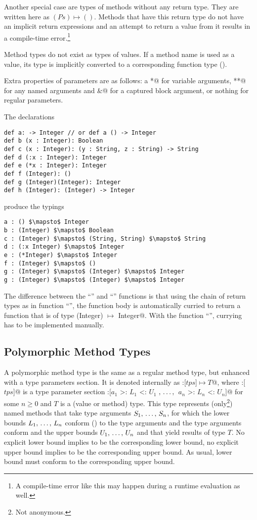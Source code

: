 Another special case are types of methods without any return type. They are written here as $(Ps) \mapsto ()$. Methods that have this return type do not have an implicit return expressions and an attempt to return a value from it results in a compile-time error.\footnote{A compile-time error like this may happen during a runtime evaluation as well.}

Method types do not exist as types of values. If a method name is used as a value, its type is implicitly converted to a corresponding function type (). 

Extra properties of parameters are as follows: a \lstinline@*@ for variable arguments, \lstinline@**@ for any named arguments and \lstinline@&@ for a captured block argument, or nothing for regular parameters. 

\example The declarations
\begin{lstlisting}
def a: -> Integer // or def a () -> Integer
def b (x : Integer): Boolean
def c (x : Integer): (y : String, z : String) -> String
def d (:x : Integer): Integer
def e (*x : Integer): Integer
def f (Integer): ()
def g (Integer)(Integer): Integer
def h (Integer): (Integer) -> Integer
\end{lstlisting}
produce the typings
\begin{lstlisting}
a : () $\mapsto$ Integer
b : (Integer) $\mapsto$ Boolean
c : (Integer) $\mapsto$ (String, String) $\mapsto$ String
d : (:x Integer) $\mapsto$ Integer
e : (*Integer) $\mapsto$ Integer
f : (Integer) $\mapsto$ ()
g : (Integer) $\mapsto$ (Integer) $\mapsto$ Integer
g : (Integer) $\mapsto$ (Integer) $\mapsto$ Integer
\end{lstlisting}

The difference between the ``'' and ``'' functions is that using the chain of return types as in function ``'', the function body is automatically curried to return a function that is of type \lstinline@(Integer) $\mapsto$ Integer@. With the function ``'', currying has to be implemented manually. 

\subsection{Polymorphic Method Types}
\label{sec:polymorphic-method-types}

A polymorphic method type is the same as a regular method type, but enhanced with a type parameters section. It is denoted internally as \lstinline@:[$tps$]$ \mapsto T$@, where \lstinline@:[$tps$]@ is a type parameter section \lstinline@:[$a_1$ >: $L_1$ <: $U_1$ $,\, \ldots ,\,$ $a_n$ >: $L_n$ <: $U_n$]@ for some $n \geq 0$ and $T$ is a (value or method) type. This type represents (only\footnote{Not anonymous.}) named methods that take type arguments $S_1 ,\, \ldots ,\, S_n$, for which the lower bounds $L_1 ,\, \ldots ,\, L_n$ conform () to the type arguments and the type arguments conform and the upper bounds $U_1 ,\, \ldots ,\, U_n$ and that yield results of type $T$. No explicit lower bound implies  to be the corresponding lower bound, no explicit upper bound implies  to be the corresponding upper bound. As usual, lower bound must conform to the corresponding upper bound. 

